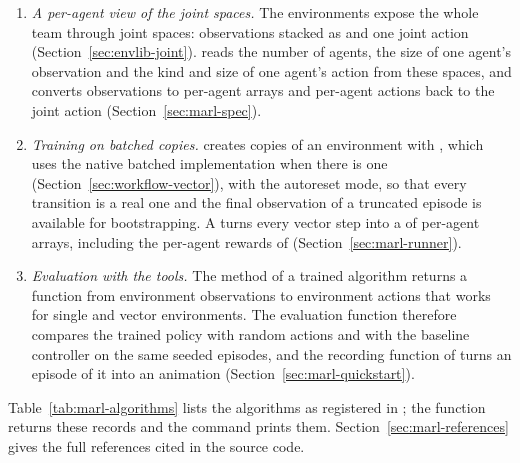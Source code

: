 \begin{enumerate}
  \item \emph{A per-agent view of the joint spaces.} The environments expose
    the whole team through joint spaces: observations stacked as
     and one joint action
    (Section~\ref{sec:envlib-joint}).  reads the number of
    agents, the size of one agent's observation and the kind and size of one
    agent's action from these spaces, and converts observations to per-agent
    arrays and per-agent actions back to the joint action
    (Section~\ref{sec:marl-spec}).
  \item \emph{Training on batched copies.}  creates
     copies of an environment with ,
    which uses the native batched implementation when there is one
    (Section~\ref{sec:workflow-vector}), with the 
    autoreset mode, so that every transition is a real one and the final
    observation of a truncated episode is available for bootstrapping. A
     turns every vector step into a  of
    per-agent arrays, including the per-agent rewards of
     (Section~\ref{sec:marl-runner}).
  \item \emph{Evaluation with the  tools.} The method
     of a trained algorithm returns a function from environment
    observations to environment actions that works for single and vector
    environments. The evaluation function  therefore
    compares the trained policy with random actions and with the baseline
    controller on the same seeded episodes, and the recording function
     of  turns an episode of it
    into an animation (Section~\ref{sec:marl-quickstart}).
\end{enumerate}

Table~\ref{tab:marl-algorithms} lists the algorithms as registered in
; the function 
returns these records and the command  prints them.
Section~\ref{sec:marl-references} gives the full references cited in the
source code.

